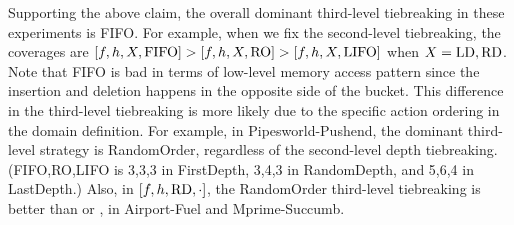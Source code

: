 Supporting the above claim, the overall dominant third-level tiebreaking
in these experiments is FIFO.  For example, when we fix the second-level
tiebreaking, the coverages are $[f,h,X,\mbox{FIFO}]>[f,h,X,\mbox{RO}]>[f,h,X,\mbox{LIFO}]$
when $X=\mbox{LD},\mbox{RD}$.  Note that FIFO is bad in terms of low-level memory
access pattern since the insertion and deletion happens in the opposite
side of the bucket.  This difference in the third-level tiebreaking is
more likely due to the specific action ordering in the domain
definition.  For example, in Pipesworld-Pushend, the dominant
third-level strategy is RandomOrder, regardless of the second-level
depth tiebreaking.  (FIFO,RO,LIFO is 3,3,3 in FirstDepth, 3,4,3 in
RandomDepth, and 5,6,4 in LastDepth.) Also, in $[f,h,\mbox{RD},\cdot]$, the
RandomOrder third-level tiebreaking is better than \lifo or \fifo, in
Airport-Fuel and Mprime-Succumb.


% 



